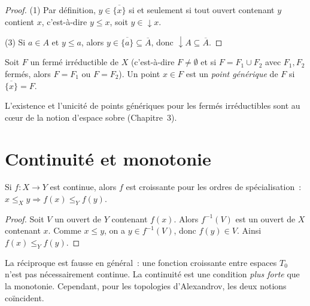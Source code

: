\begin{proof}
(1) Par d\'efinition, $y \in \overline{\{x\}}$ si et seulement si tout ouvert contenant $y$
contient $x$, c'est-\`a-dire $y \leq x$, soit $y \in \downarrow\! x$.

(3) Si $a \in A$ et $y \leq a$, alors $y \in \overline{\{a\}} \subseteq \overline{A}$,
donc $\downarrow\! A \subseteq \overline{A}$.
\end{proof}

\begin{definition}
Soit $F$ un ferm\'e irr\'eductible de $X$ (c'est-\`a-dire $F \neq \emptyset$ et si
$F = F_1 \cup F_2$ avec $F_1, F_2$ ferm\'es, alors $F = F_1$ ou $F = F_2$). Un point
$x \in F$ est un \emph{point g\'en\'erique} de $F$ si $\overline{\{x\}} = F$.
\end{definition}

\begin{remarque}
L'existence et l'unicit\'e de points g\'en\'eriques pour les ferm\'es irr\'eductibles sont
au c\oe ur de la notion d'espace sobre (Chapitre~3).
\end{remarque}

\section{Continuit\'e et monotonie}

\begin{theoreme}
Si $f\colon X \to Y$ est continue, alors $f$ est croissante pour les ordres de
sp\'ecialisation~: $x \leq_X y \Rightarrow f(x) \leq_Y f(y)$.
\end{theoreme}

\begin{proof}
Soit $V$ un ouvert de $Y$ contenant $f(x)$. Alors $f^{-1}(V)$ est un ouvert de $X$
contenant $x$. Comme $x \leq y$, on a $y \in f^{-1}(V)$, donc $f(y) \in V$. Ainsi
$f(x) \leq_Y f(y)$.
\end{proof}

\begin{attention}
La r\'eciproque est fausse en g\'en\'eral~: une fonction croissante entre espaces $T_0$
n'est pas n\'ecessairement continue. La continuit\'e est une condition \emph{plus forte}
que la monotonie. Cependant, pour les topologies d'Alexandrov, les deux notions
co\"incident.
\end{attention}

